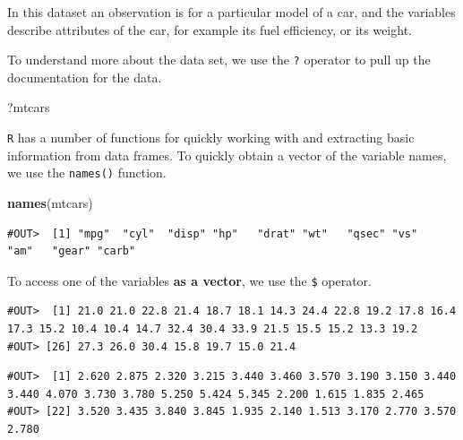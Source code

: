 \documentclass[]{book}
\newenvironment{Shaded}{\begin{snugshade}}{\end{snugshade}}
\newcommand{\KeywordTok}[1]{\textcolor[rgb]{0.13,0.29,0.53}{\textbf{#1}}}
\newcommand{\NormalTok}[1]{#1}
\newcommand{\OperatorTok}[1]{\textcolor[rgb]{0.81,0.36,0.00}{\textbf{#1}}}
\begin{document}
In this dataset an observation is for a particular model of a car, and the variables describe attributes of the car, for example its fuel efficiency, or its weight.

To understand more about the data set, we use the \texttt{?} operator to pull up the documentation for the data.

\begin{Shaded}
\begin{Highlighting}[]
\NormalTok{?mtcars}
\end{Highlighting}
\end{Shaded}

\texttt{R} has a number of functions for quickly working with and extracting basic information from data frames. To quickly obtain a vector of the variable names, we use the \texttt{names()} function.

\begin{Shaded}
\begin{Highlighting}[]
\KeywordTok{names}\NormalTok{(mtcars)}
\end{Highlighting}
\end{Shaded}

\begin{verbatim}
#OUT>  [1] "mpg"  "cyl"  "disp" "hp"   "drat" "wt"   "qsec" "vs"   "am"   "gear" "carb"
\end{verbatim}

To access one of the variables \textbf{as a vector}, we use the \texttt{\$} operator.

\begin{Shaded}
\end{Shaded}

\begin{verbatim}
#OUT>  [1] 21.0 21.0 22.8 21.4 18.7 18.1 14.3 24.4 22.8 19.2 17.8 16.4 17.3 15.2 10.4 10.4 14.7 32.4 30.4 33.9 21.5 15.5 15.2 13.3 19.2
#OUT> [26] 27.3 26.0 30.4 15.8 19.7 15.0 21.4
\end{verbatim}

\begin{Shaded}
\end{Shaded}

\begin{verbatim}
#OUT>  [1] 2.620 2.875 2.320 3.215 3.440 3.460 3.570 3.190 3.150 3.440 3.440 4.070 3.730 3.780 5.250 5.424 5.345 2.200 1.615 1.835 2.465
#OUT> [22] 3.520 3.435 3.840 3.845 1.935 2.140 1.513 3.170 2.770 3.570 2.780
\end{verbatim}
\end{document}
